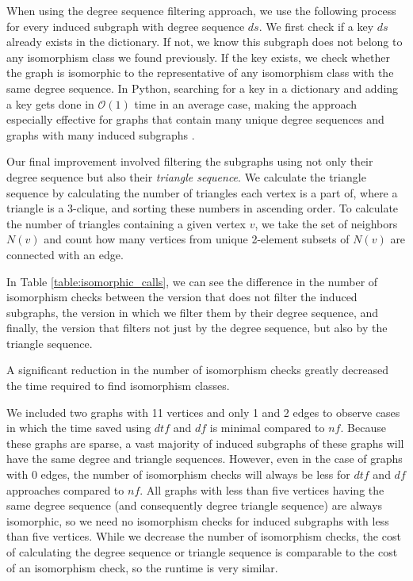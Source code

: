 When using the degree sequence filtering approach, we use the following process for every induced subgraph with degree sequence $ds$. We first check if a key $ds$ already exists in the dictionary. If not, we know this subgraph does not belong to any isomorphism class we found previously. If the key exists, we check whether the graph is isomorphic to the representative of any isomorphism class with the same degree sequence. In Python, searching for a key in a dictionary and adding a key gets done in $\mathcal{O}(1)$ time in an average case, making the approach especially effective for graphs that contain many unique degree sequences and graphs with many induced subgraphs \cite{dicttime}.

Our final improvement involved filtering the subgraphs using not only their degree sequence but also their \emph{triangle sequence}. We calculate the triangle sequence by calculating the number of triangles each vertex is a part of, where a triangle is a 3-clique, and sorting these numbers in ascending order. To calculate the number of triangles containing a given vertex $v$, we take the set of neighbors $N(v)$ and count how many vertices from unique 2-element subsets of $N(v)$ are connected with an edge.

In Table \ref{table:isomorphic_calls}, we can see the difference in the number of isomorphism checks between the version that does not filter the induced subgraphs, the version in which we filter them by their degree sequence, and finally, the version that filters not just by the degree sequence, but also by the triangle sequence.

A significant reduction in the number of isomorphism checks greatly decreased the time required to find isomorphism classes.

We included two graphs with 11 vertices and only 1 and 2 edges to observe cases in which the time saved using $dtf$ and $df$ is minimal compared to $nf$. Because these graphs are sparse, a vast majority of induced subgraphs of these graphs will have the same degree and triangle sequences. However, even in the case of graphs with 0 edges, the number of isomorphism checks will always be less for $dtf$ and $df$ approaches compared to $nf$. All graphs with less than five vertices having the same degree sequence (and consequently degree triangle sequence) are always isomorphic, so we need no isomorphism checks for induced subgraphs with less than five vertices. While we decrease the number of isomorphism checks, the cost of calculating the degree sequence or triangle sequence is comparable to the cost of an isomorphism check, so the runtime is very similar.

